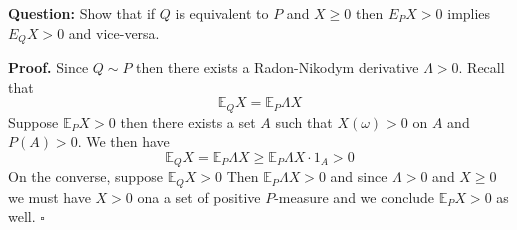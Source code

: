 \documentclass{article}
\begin{document}
\begin{tcolorbox}[colframe=black,colback=gray!5,boxrule=0.5pt]
\textbf{Question:} Show that if $Q$ is equivalent to $P$ and $X\geq0$ then $E_PX > 0 $ implies $E_QX>0$ and vice-versa. 
\end{tcolorbox}
\textbf{Proof.} Since $Q\sim P$ then there exists a Radon-Nikodym derivative $\Lambda>0$. Recall that 
$$\mathbb{E}_QX = \mathbb{E}_P\Lambda X$$
Suppose $\mathbb{E}_PX >0$ then there exists a set $A$ such that $X(\omega)>0$ on $A$ and $P(A)>0$. We then have
$$\mathbb{E}_QX = \mathbb{E}_P\Lambda X \geq \mathbb{E}_P\Lambda X\cdot1_A>0$$
On the converse, suppose $\mathbb{E}_Q X> 0$ Then $\mathbb{E}_P\Lambda X>0$ and since $\Lambda > 0$ and $X\geq 0$ we must have $X>0$ ona a set of positive $P$-measure and we conclude $\mathbb{E}_PX>0$ as well. $\square$
\end{document}

